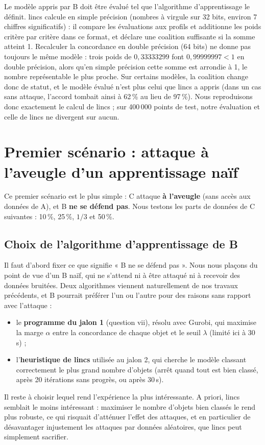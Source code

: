 \documentclass[11pt,a4paper]{article}
\begin{document}
Le modèle appris par B doit être évalué tel que l'algorithme d'apprentissage le définit. lincs calcule en
simple précision (nombres à virgule sur 32 bits, environ 7 chiffres significatifs) : il compare les évaluations
aux profils et additionne les poids critère par critère dans ce format, et déclare une coalition suffisante si
la somme atteint 1. Recalculer la concordance en double précision (64 bits) ne donne pas toujours le même
modèle : trois poids de $0{,}33333299$ font $0{,}99999997 < 1$ en double précision, alors qu'en simple
précision cette somme est arrondie à 1, le nombre représentable le plus proche. Sur certains modèles, la
coalition change donc de statut, et le modèle évalué n'est plus celui que lincs a appris (dans un cas sans
attaque, l'accord tombait ainsi à 62\,\% au lieu de 97\,\%). Nous reproduisons donc exactement le calcul de
lincs ; sur 400\,000 points de test, notre évaluation et celle de lincs ne divergent sur aucun.

\section{Premier scénario : attaque à l'aveugle d'un apprentissage naïf}

Ce premier scénario est le plus simple : C attaque \textbf{à l'aveugle}
(sans accès aux données de A), et B \textbf{ne se défend pas}. Nous testons les parts de données de C
suivantes : 10\,\%, 25\,\%, $1/3$ et 50\,\%.

\subsection{Choix de l'algorithme d'apprentissage de B}

Il faut d'abord fixer ce que signifie « B ne se défend pas ». Nous nous plaçons du point de vue d'un B naïf,
qui ne s'attend ni à être attaqué ni à recevoir des données bruitées. Deux algorithmes viennent naturellement
de nos travaux précédents, et B pourrait préférer l'un ou l'autre pour des raisons sans rapport avec
l'attaque :
\begin{itemize}
  \item le \textbf{programme du jalon 1} (question vii), résolu avec Gurobi, qui maximise la marge $\alpha$
        entre la concordance de chaque objet et le seuil $\lambda$ (limité ici à 30\,s) ;
  \item l'\textbf{heuristique de lincs} utilisée au jalon 2, qui cherche le modèle classant correctement le plus
        grand nombre d'objets (arrêt quand tout est bien classé, après 20 itérations sans progrès, ou après 30\,s).
\end{itemize}
Il reste à choisir lequel rend l'expérience la plus intéressante. A priori, lincs semblait le moins
intéressant : maximiser le nombre d'objets bien classés le rend plus robuste, ce qui risquait d'atténuer
l'effet des attaques, et en particulier de désavantager injustement les attaques par données aléatoires, que
lincs peut simplement sacrifier.
\end{document}
